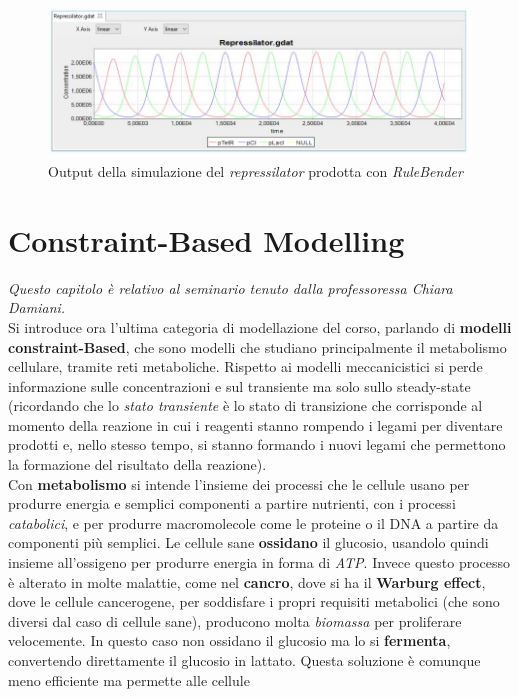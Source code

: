 \documentclass[a4paper,12pt, oneside]{book}
\begin{document}
\begin{figure}
  \centering
  \includegraphics[scale = 0.4]{img/rulb2.jpg}
  \caption{Output della simulazione del \textit{repressilator} prodotta con
    \textit{RuleBender}}
  \label{fig:ruleb2}
\end{figure}
\chapter{Constraint-Based Modelling}
\textit{Questo capitolo è relativo al seminario tenuto dalla professoressa
  Chiara Damiani.}\\
Si introduce ora l'ultima categoria di modellazione del corso, parlando di
\textbf{modelli constraint-Based}, che sono modelli che studiano principalmente
il metabolismo cellulare, tramite reti metaboliche. Rispetto ai modelli
meccanicistici si perde informazione sulle concentrazioni e sul transiente ma
solo sullo steady-state (ricordando che lo \textit{stato transiente} è lo
stato di transizione che corrisponde al momento della reazione in cui i reagenti
stanno rompendo i legami per diventare prodotti e, nello stesso tempo, si stanno
formando i nuovi legami che permettono la formazione del risultato della
reazione). \\
Con \textbf{metabolismo} si intende l'insieme dei processi che le cellule usano
per produrre energia e semplici componenti a partire nutrienti, con i processi
\textit{catabolici}, e 
per produrre macromolecole come le proteine o il DNA a partire da componenti più
semplici. Le cellule sane \textbf{ossidano} il glucosio, usandolo quindi insieme
all'ossigeno per produrre energia in forma di \textit{ATP}. Invece questo
processo è 
alterato in molte malattie, come nel \textbf{cancro}, dove si ha il
\textbf{Warburg 
  effect}, dove le cellule cancerogene, per soddisfare i propri requisiti
metabolici (che sono diversi dal caso di cellule sane), producono molta
\textit{biomassa} per proliferare velocemente. In questo caso non ossidano il
glucosio ma lo si \textbf{fermenta}, convertendo direttamente il glucosio in
lattato. Questa soluzione è comunque meno efficiente ma permette alle cellule
\end{document}
